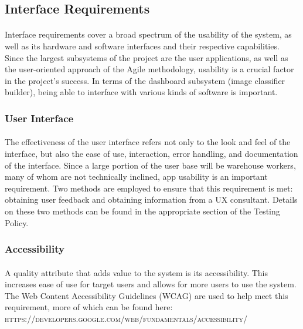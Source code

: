 \documentclass[a4paper, 11pt]{article}
\begin{document}
   \subsection{Interface Requirements}
        \paragraph{}
        Interface requirements cover a broad spectrum of the usability of the system, as well as its hardware and software interfaces and their respective capabilities. Since the largest subsystems of the project are the user applications, as well as the user-oriented approach of the Agile methodology, usability is a crucial factor in the project’s success. In terms of the dashboard subsystem (image classifier builder), being able to interface with various kinds of software is important.
        
            \subsubsection{User Interface}
            \paragraph{}
            The effectiveness of the user interface refers not only to the look and feel of the interface, but also the ease of use, interaction, error handling, and documentation of the interface. Since a large portion of the user base will be warehouse workers, many of whom are not technically inclined, app usability is an important requirement. Two methods are employed to ensure that this requirement is met: obtaining user feedback and obtaining information from a UX consultant. Details on these two methods can be found in the appropriate section of the Testing Policy.
            
            \subsubsection{Accessibility}
            \paragraph{}
            A quality attribute that adds value to the system is its accessibility. This increases ease of use for target users and allows for more users to use the system. The Web Content Accessibility Guidelines (WCAG) are used to help meet this requirement, more of which can be found here:\\
            \textsc{https://developers.google.com/web/fundamentals/accessibility/}
\end{document}
